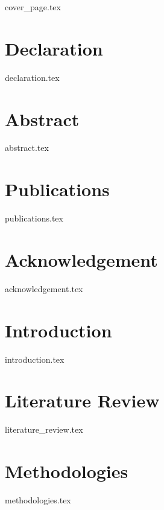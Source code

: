 \documentclass[a4paper, 12pt, oneside]{book}
\begin{document}
\frontmatter
{cover_page.tex}


\chapter*{Declaration}
{declaration.tex}

\chapter*{Abstract}
{abstract.tex}

\chapter*{Publications}
{publications.tex}

\chapter*{Acknowledgement}
{acknowledgement.tex}

{  %

\tableofcontents

\listoffigures

{\let\clearpage\relax
\listoftables}

\printglossary[type=\acronymtype,nonumberlist, style=super
]
}

\mainmatter


\chapter{Introduction}
{introduction.tex}

\chapter{Literature Review}
{literature_review.tex}

\chapter{Methodologies}
{methodologies.tex}
\end{document}
